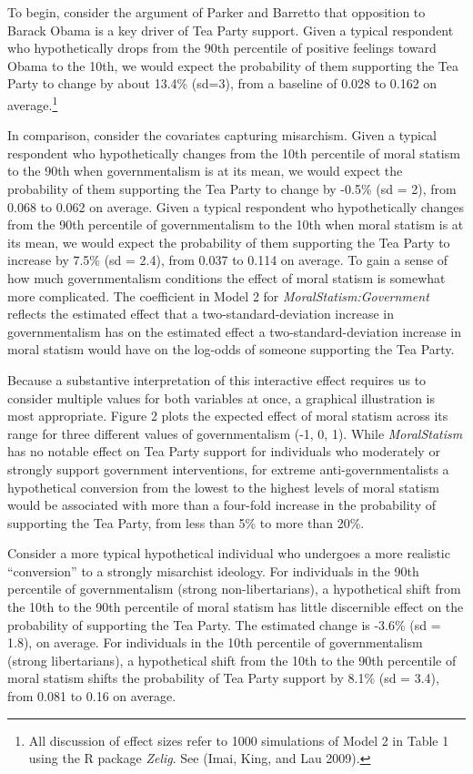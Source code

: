 \documentclass[12pt,]{article}
\let\rmarkdownfootnote\footnote%
\def\footnote{\protect\rmarkdownfootnote}
\begin{document}
To begin, consider the argument of Parker and Barretto that opposition
to Barack Obama is a key driver of Tea Party support. Given a typical
respondent who hypothetically drops from the 90th percentile of positive
feelings toward Obama to the 10th, we would expect the probability of
them supporting the Tea Party to change by about 13.4\% (sd=3), from a
baseline of 0.028 to 0.162 on average.\footnote{All discussion of effect
  sizes refer to 1000 simulations of Model 2 in Table 1 using the R
  package \emph{Zelig}. See (Imai, King, and Lau 2009).}

In comparison, consider the covariates capturing misarchism. Given a
typical respondent who hypothetically changes from the 10th percentile
of moral statism to the 90th when governmentalism is at its mean, we
would expect the probability of them supporting the Tea Party to change
by -0.5\% (sd = 2), from 0.068 to 0.062 on average. Given a typical
respondent who hypothetically changes from the 90th percentile of
governmentalism to the 10th when moral statism is at its mean, we would
expect the probability of them supporting the Tea Party to increase by
7.5\% (sd = 2.4), from 0.037 to 0.114 on average. To gain a sense of how
much governmentalism conditions the effect of moral statism is somewhat
more complicated. The coefficient in Model 2 for
\emph{MoralStatism:Government} reflects the estimated effect that a
two-standard-deviation increase in governmentalism has on the estimated
effect a two-standard-deviation increase in moral statism would have on
the log-odds of someone supporting the Tea Party.

Because a substantive interpretation of this interactive effect requires
us to consider multiple values for both variables at once, a graphical
illustration is most appropriate. Figure 2 plots the expected effect of
moral statism across its range for three different values of
governmentalism (-1, 0, 1). While \emph{MoralStatism} has no notable
effect on Tea Party support for individuals who moderately or strongly
support government interventions, for extreme anti-governmentalists a
hypothetical conversion from the lowest to the highest levels of moral
statism would be associated with more than a four-fold increase in the
probability of supporting the Tea Party, from less than 5\% to more than
20\%.

Consider a more typical hypothetical individual who undergoes a more
realistic ``conversion'' to a strongly misarchist ideology. For
individuals in the 90th percentile of governmentalism (strong
non-libertarians), a hypothetical shift from the 10th to the 90th
percentile of moral statism has little discernible effect on the
probability of supporting the Tea Party. The estimated change is -3.6\%
(sd = 1.8), on average. For individuals in the 10th percentile of
governmentalism (strong libertarians), a hypothetical shift from the
10th to the 90th percentile of moral statism shifts the probability of
Tea Party support by 8.1\% (sd = 3.4), from 0.081 to 0.16 on average.
\end{document}
